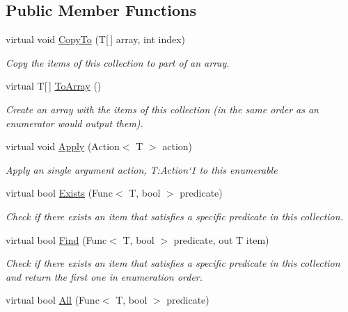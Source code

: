 \subsection*{Public Member Functions}
\begin{DoxyCompactItemize}
\item 
virtual void \hyperlink{class_c5_1_1_collection_value_base_ab238770f168304e89664f814925522da}{Copy\+To} (T\mbox{[}$\,$\mbox{]} array, int index)
\begin{DoxyCompactList}\small\item\em Copy the items of this collection to part of an array. \end{DoxyCompactList}\item 
virtual T\mbox{[}$\,$\mbox{]} \hyperlink{class_c5_1_1_collection_value_base_a740757aebaa1365811e76729e59f338d}{To\+Array} ()
\begin{DoxyCompactList}\small\item\em Create an array with the items of this collection (in the same order as an enumerator would output them). \end{DoxyCompactList}\item 
virtual void \hyperlink{class_c5_1_1_collection_value_base_a1de9661198b86224773dcdc9d1678020}{Apply} (Action$<$ T $>$ action)
\begin{DoxyCompactList}\small\item\em Apply an single argument action, T\+:\+Action`1 to this enumerable \end{DoxyCompactList}\item 
virtual bool \hyperlink{class_c5_1_1_collection_value_base_af8e9e1630489ab12d89363cf4ab0e2ab}{Exists} (Func$<$ T, bool $>$ predicate)
\begin{DoxyCompactList}\small\item\em Check if there exists an item that satisfies a specific predicate in this collection. \end{DoxyCompactList}\item 
virtual bool \hyperlink{class_c5_1_1_collection_value_base_a90b979207d15086a9b64c9c689e17d4f}{Find} (Func$<$ T, bool $>$ predicate, out T item)
\begin{DoxyCompactList}\small\item\em Check if there exists an item that satisfies a specific predicate in this collection and return the first one in enumeration order. \end{DoxyCompactList}\item 
virtual bool \hyperlink{class_c5_1_1_collection_value_base_ad13a5bb7f735bf175add1e275b6d64ab}{All} (Func$<$ T, bool $>$ predicate)

\end{DoxyCompactItemize}
